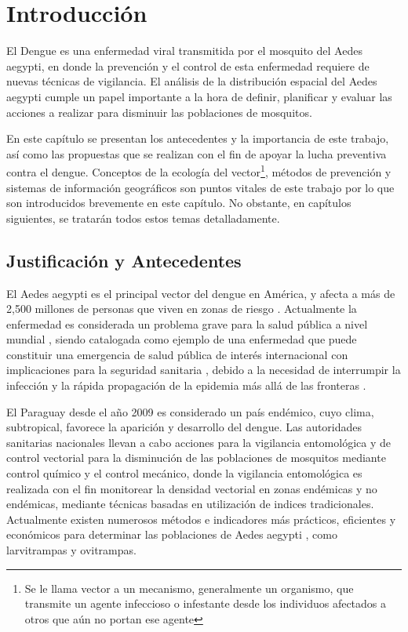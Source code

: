 \chapter{Introducción}

El Dengue es una enfermedad viral transmitida por el mosquito del Aedes aegypti, en donde la
prevención y el control de esta enfermedad requiere de nuevas técnicas de vigilancia. El análisis
de la distribución espacial del Aedes aegypti cumple un papel importante a la hora de definir,
planificar y evaluar las acciones a realizar para disminuir las poblaciones de mosquitos.

En este capítulo se presentan los antecedentes y la importancia de este trabajo, así como las
propuestas que se realizan con el fin de apoyar la lucha preventiva contra el dengue. Conceptos de
la ecología del vector\footnote{Se le llama vector a un mecanismo, generalmente un organismo, que
transmite un agente infeccioso o infestante desde los individuos afectados a otros que aún no
portan ese agente}, métodos de prevención y sistemas de información geográficos son puntos
vitales de este trabajo por lo que son introducidos brevemente en este capítulo. No obstante, en
capítulos siguientes, se tratarán todos estos temas detalladamente.

\section{Justificación y Antecedentes}
El Aedes aegypti es el principal vector del dengue en América, y afecta a más de 2,500 millones
de personas que viven en zonas de riesgo \cite{world2009dengue, gustavo2006dengue}. Actualmente la enfermedad es considerada un problema grave para la salud pública a nivel mundial
\cite{dengueUruguayCap1, world2009dengue, DIBO2005}, siendo catalogada como ejemplo de una
enfermedad que puede constituir una emergencia de salud pública de interés internacional con
implicaciones para la seguridad sanitaria \cite{dengueUruguayCap1, world2009dengue}, debido a la
necesidad de interrumpir la infección y la rápida propagación de la epidemia más allá de las
fronteras \cite{world2009dengue}.

El Paraguay desde el año 2009 es considerado un país endémico, cuyo clima, subtropical, favorece
la aparición y desarrollo del dengue. Las autoridades sanitarias nacionales llevan a cabo
acciones para la vigilancia entomológica y de control vectorial para la disminución de las
poblaciones de mosquitos mediante control químico y el control mecánico, donde la vigilancia
entomológica es realizada con el fin monitorear la densidad vectorial en zonas endémicas y no
endémicas, mediante técnicas basadas en utilización de indices tradicionales. Actualmente existen
numerosos métodos e indicadores más prácticos, eficientes y económicos para determinar las
poblaciones de Aedes aegypti \cite{cenaprece2013}, como larvitrampas y ovitrampas.


